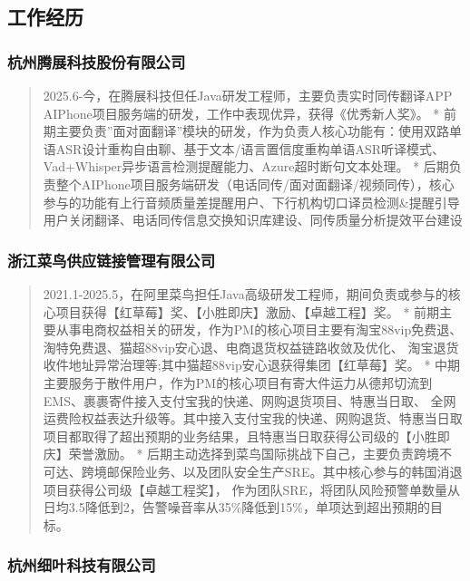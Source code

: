\subsection{工作经历}\label{ux5de5ux4f5cux7ecfux5386}

\subsubsection{杭州腾展科技股份有限公司}\label{ux676dux5ddeux817eux5c55ux79d1ux6280ux80a1ux4efdux6709ux9650ux516cux53f8}

\begin{quote}
2025.6-今，在腾展科技但任Java研发工程师，主要负责实时同传翻译APP
AIPhone项目服务端的研发，工作中表现优异，获得《优秀新人奖》。 *
前期主要负责''面对面翻译''模块的研发，作为负责人核心功能有：使用双路单语ASR设计重构自由聊、基于文本/语言置信度重构单语ASR听译模式、Vad+Whisper异步语言检测提醒能力、Azure超时断句文本处理。
*
后期负责整个AIPhone项目服务端研发（电话同传/面对面翻译/视频同传），核心参与的功能有上行音频质量差提醒用户、下行机构切口译员检测\&提醒引导用户关闭翻译、电话同传信息交换知识库建设、同传质量分析提效平台建设
\end{quote}

\subsubsection{浙江菜鸟供应链接管理有限公司}\label{ux6d59ux6c5fux83dcux9e1fux4f9bux5e94ux94feux63a5ux7ba1ux7406ux6709ux9650ux516cux53f8}

\begin{quote}
2021.1-2025.5，在阿里菜鸟担任Java高级研发工程师，期间负责或参与的核心项目获得【红草莓】奖、【小胜即庆】激励、【卓越工程】奖。
*
前期主要从事电商权益相关的研发，作为PM的核心项目主要有淘宝88vip免费退、淘特免费退、猫超88vip安心退、电商退货权益链路收敛及优化、
淘宝退货收件地址异常治理等;其中猫超88vip安心退获得集团【红草莓】奖。 *
中期主要服务于散件用户，作为PM的核心项目有寄大件运力从德邦切流到EMS、裹裹寄件接入支付宝我的快递、网购退货项目、特惠当日取、
全网运费险权益表达升级等。其中接入支付宝我的快递、网购退货、特惠当日取项目都取得了超出预期的业务结果，且特惠当日取获得公司级的【小胜即庆】荣誉激励。
*
后期主动选择到菜鸟国际挑战下自己，主要负责跨境不可达、跨境邮保险业务、以及团队安全生产SRE。其中核心参与的韩国消退项目获得公司级【卓越工程奖】，
作为团队SRE，将团队风险预警单数量从日均3.5降低到2，告警噪音率从35\%降低到15\%，单项达到超出预期的目标。
\end{quote}

\subsubsection{杭州细叶科技有限公司}\label{ux676dux5ddeux7ec6ux53f6ux79d1ux6280ux6709ux9650ux516cux53f8}

